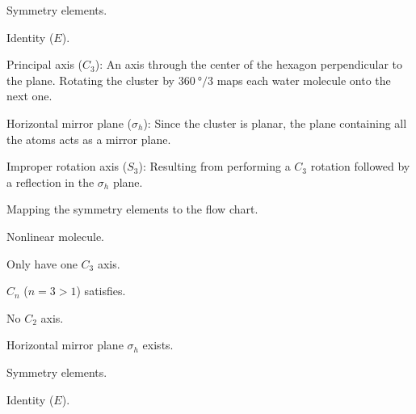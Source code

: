 \begin{solution}\leavevmode
  \begin{enumext}
    \item
    \begin{enumext}
      \item Symmetry elements.
      \begin{enumext}[label = \arabic*.]
        \item Identity ($E$).
        \item Principal axis ($C_3$): An axis through the center of the hexagon
        perpendicular to the plane. Rotating the cluster by $\qty{360}\degree/3$
        maps each water molecule onto the next one.
        \item Horizontal mirror plane ($\sigma_h$): Since the cluster is planar,
        the plane containing all the atoms acts as a mirror plane.
        \item Improper rotation axis ($S_3$): Resulting from performing a $C_3$
        rotation followed by a reflection in the $\sigma_h$ plane.
      \end{enumext}
      \item Mapping the symmetry elements to the flow chart.
      \begin{enumext}[label = \arabic*., columns = 2]
        \item Nonlinear molecule.
        \item Only have one $C_3$ axis.
        \item $C_n$ ($n = 3 > 1$) satisfies.
        \item No $C_2$ axis.
        \item Horizontal mirror plane $\sigma_h$ exists.
      \end{enumext}
      \begin{center}
      \end{center}
    \end{enumext}
    \pagebreak
    \item
    \begin{enumext}
      \item Symmetry elements.
      \begin{enumext}[label = \arabic*.]
        \item Identity ($E$).

\end{enumext}
\end{enumext}
\end{enumext}
\end{solution}
